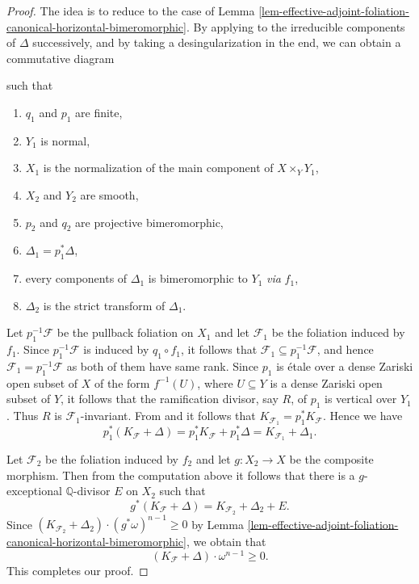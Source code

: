 \documentclass[12pt]{amsart}
\newcommand{\mbZ}{\mathbb{Z}}
\newcommand{\mbQ}{\mathbb{Q}}
\newcommand{\<}{\leq}
\def\>{\geq}
\def\subset{\subseteq}
\newcommand{\D}{\Delta}
\def\mcF{\mathcal{F}}
\theoremstyle{remark}
\theoremstyle{definition}
\theoremstyle{definition}
\numberwithin{equation}{section}
\theoremstyle{definition}
\theoremstyle{definition}
\begin{document}
\begin{proof}
The idea is to reduce to the case of Lemma \ref{lem-effective-adjoint-foliation-canonical-horizontal-bimeromorphic}.  
By applying \cite[Lemma 9.11]{DasOu2022}  to the irreducible components of $\D$ successively, 
and by taking a desingularization in the end, we can obtain  a commutative diagram 

\centerline{
\xymatrix{
(X_2,\D_2)\ar[d]_{f_2} \ar[r]^{p_2}  & (X_1,\D_1) \ar[d]^{f_1}   \ar[r]^{p_1} 
& (X,\D) \ar[d]^{f}   \\
Y_2\ar[r]_{q_2} & Y_1 \ar[r]_{q_1}   & Y
}
}

\noindent such that 
\begin{enumerate}
\item $q_1$ and $p_1$ are finite,
\item $Y_1$ is normal, 
\item $X_1$ is the normalization of the main component of $X\times_{Y} Y_1$,
\item $X_2$ and $Y_2$ are smooth,
\item $p_2$ and $q_2$ are projective bimeromorphic,
\item %
       {$\D_1 = p^*_1 \D$},
\item every components of $\D_1$ is bimeromorphic to $Y_1$ \textit{via} $f_1$,
\item $\D_2$ is the strict transform of $\D_1$. 
\end{enumerate}

Let $p_1^{-1}\mcF$ be the pullback foliation on $X_1$ and let $\mcF_1$ be the foliation induced by $f_1$.  Since $p_1^{-1}\mcF$ is induced by $q_1\circ f_1$, it follows that $\mcF_1\subset p_1^{-1}\mcF$, and hence $\mcF_1=p_1^{-1}\mcF$ as both of them have same rank. 
Since  $p_1$ is \'etale over a dense Zariski open subset of $X$ of the form $f^{-1}(U)$, where $U\subset Y$ is a dense Zariski open subset of $Y$, it follows that the ramification divisor, say $R$,  of $p_1$ is vertical over  $Y_1$. 
Thus $R$ is $\mcF_1$-invariant. 
From   \cite[Lemma 3.4]{Dru21} and \cite[Proposition 2.2]{CS20} it follows that $K_{\mcF_1}=p_1^*K_{\mcF}$. 
Hence  we have
\[ 
 p_1^*(K_{\mcF }+\D ) = p_1^*K_{\mcF } + p_1^*\D  = K_{\mcF_1} + \D_1.
\]

Let $\mcF_2$ be the foliation induced by $f_2$ and let $g: X_2\to X$ be the composite morphism. 
Then from the computation above it follows that there is a $g$-exceptional $\mbQ$-divisor $E$ on $X_2$ such that 
\[g^* (K_{\mcF}+\D) = K_{\mcF_2} + \D_2+E.\] 
Since  $(K_{\mcF_2}+\D_2) \cdot (g^*\omega)^{n-1} \> 0 $  by  Lemma \ref{lem-effective-adjoint-foliation-canonical-horizontal-bimeromorphic},  
we obtain that 
\[ 
(K_{\mcF}+\D) \cdot \omega^{n-1} \> 0.
\]
This completes our proof. 
\end{proof}
\end{document}

